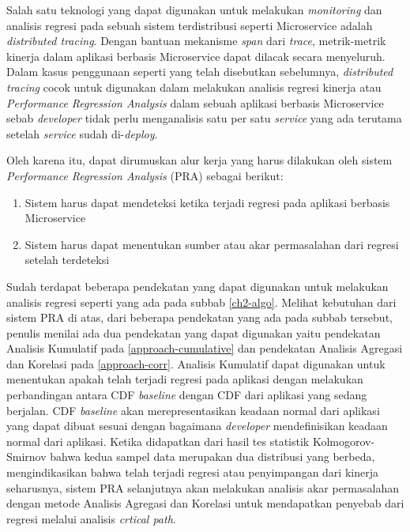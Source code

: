 Salah satu teknologi yang dapat digunakan untuk melakukan \textit{monitoring} dan analisis regresi pada sebuah sistem terdistribusi seperti Microservice adalah \textit{distributed tracing}. Dengan bantuan mekanisme \textit{span} dari \textit{trace}, metrik-metrik kinerja dalam aplikasi berbasis Microservice dapat dilacak secara menyeluruh. Dalam kasus penggunaan seperti yang telah disebutkan sebelumnya, \textit{distributed tracing} cocok untuk digunakan dalam melakukan analisis regresi kinerja atau \textit{Performance Regression Analysis} dalam sebuah aplikasi berbasis Microservice sebab \textit{developer} tidak perlu menganalisis satu per satu \textit{service} yang ada terutama setelah \textit{service} sudah di-\textit{deploy}.

Oleh karena itu, dapat dirumuskan alur kerja yang harus dilakukan oleh sistem \textit{Performance Regression Analysis} (PRA) sebagai berikut:
\begin{enumerate}
	\item Sistem harus dapat mendeteksi ketika terjadi regresi pada aplikasi berbasis Microservice
	\item Sistem harus dapat menentukan sumber atau akar permasalahan dari regresi setelah terdeteksi
\end{enumerate}

Sudah terdapat beberapa pendekatan yang dapat digunakan untuk melakukan analisis regresi seperti yang ada pada subbab \ref{ch2-algo}. Melihat kebutuhan dari sistem PRA di atas, dari beberapa pendekatan yang ada pada subbab tersebut, penulis menilai ada dua pendekatan yang dapat digunakan yaitu pendekatan Analisis Kumulatif pada \ref{approach-cumulative} dan pendekatan Analisis Agregasi dan Korelasi pada \ref{approach-corr}. Analisis Kumulatif dapat digunakan untuk menentukan apakah telah terjadi regresi pada aplikasi dengan melakukan perbandingan antara CDF \textit{baseline} dengan CDF dari aplikasi yang sedang berjalan. CDF \textit{baseline} akan merepresentasikan keadaan normal dari aplikasi yang dapat dibuat sesuai dengan bagaimana \textit{developer} mendefinisikan keadaan normal dari aplikasi. Ketika didapatkan dari hasil tes statistik Kolmogorov-Smirnov bahwa kedua sampel data merupakan dua distribusi yang berbeda, mengindikasikan bahwa telah terjadi regresi atau penyimpangan dari kinerja seharusnya, sistem PRA selanjutnya akan melakukan analisis akar permasalahan dengan metode Analisis Agregasi dan Korelasi untuk mendapatkan penyebab dari regresi melalui analisis \textit{crtical path}.

